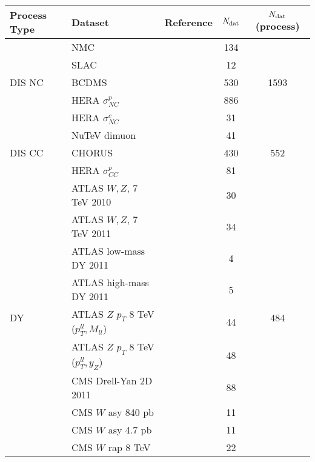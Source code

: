 \begin{table}[!t]
  \centering
  \scriptsize
  \renewcommand{\arraystretch}{1.13}
  \begin{tabularx}{\textwidth}{llccc}
\toprule

  \textbf{Process Type} &  \textbf{Dataset}   &   \textbf{Reference}    &   \textbf{$N_{\rm dat}$}     &  \textbf{$N_{\rm dat}$ (process)}      \\
\midrule
\multirow{5}{*}{DIS NC}  & NMC    &  \cite{Arneodo:1996kd,Arneodo:1996qe}  & 134  &
\multirow{5}{*}{1593}  \\
        & SLAC     & \cite{Whitlow:1991uw}     & 12  &    \\
        & BCDMS   & \cite{bcdms1,bcdms2}      & 530  & \\
        & HERA $\sigma^p_{NC}$     & \cite{Abramowicz:2015mha} & 886  & \\
        & HERA $\sigma^c_{NC}$     & \cite{Abramowicz:1900rp}  & 31  & \\
\midrule
\multirow{3}{*}{DIS CC}  & NuTeV dimuon  &\cite{Goncharov:2001qe,MasonPhD}
& 41  &
\multirow{3}{*}{552}\\
         & CHORUS  & \cite{Onengut:2005kv} & 430  &\\
        & HERA $\sigma^p_{CC}$   & \cite{Abramowicz:2015mha}& 81  & \\
\midrule
\multirow{19}{*}{DY}      &
  ATLAS $W,Z$, 7 TeV 2010  & \cite{Aad:2011dm} & 30  & \multirow{19}{*}{484}  \\
& ATLAS $W,Z$, 7 TeV 2011  &  \cite{Aaboud:2016btc} & 34  & \\
& ATLAS low-mass DY 2011  & \cite{Aad:2014qja} & 4  &\\
& ATLAS high-mass DY 2011  & \cite{Aad:2013iua} & 5  &\\
& ATLAS $Z$ $p_T$ 8 TeV ($p_T^{ll}, M_{ll}$) & \cite{Aad:2015auj} & 44  &\\
& ATLAS $Z$ $p_T$ 8 TeV ($p_T^{ll}, y_Z$) & \cite{Aad:2015auj} &  48   &\\
& CMS Drell-Yan 2D 2011    &  \cite{Chatrchyan:2013tia}    & 88  &   \\
& CMS $W$ asy 840 pb   & \cite{Chatrchyan:2012xt}    & 11   &   \\
& CMS $W$ asy 4.7 pb       & \cite{Chatrchyan:2013mza}  &11   & \\
& CMS $W$ rap 8 TeV   &  \cite{Khachatryan:2016pev}     &  22  &     \\

\end{tabularx}
\end{table}
